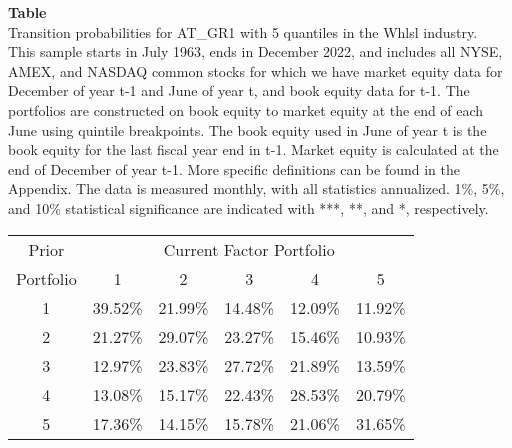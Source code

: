 \begin{table*}[ht!]
\raggedright
{}
\label{tab: transition_probs_AT_GR1_Whlsl_with_5_quantiles}
\textbf{Table \thetable} \\
Transition probabilities for AT_GR1 with 5 quantiles in the Whlsl industry. \\
\hspace*{1em}This sample starts in July 1963, ends in December 2022, and includes all NYSE, AMEX, and NASDAQ common stocks for which we have market equity data for December of year t-1 and June of year t, and book equity data for t-1. The portfolios are constructed on book equity to market equity at the end of each June using quintile breakpoints.  The book equity used in June of year t is the book equity for the last fiscal year end in t-1.  Market equity is calculated at the end of December of year t-1.  More specific definitions can be found in the Appendix.  The data is measured monthly, with all statistics annualized.  1\%, 5\%, and 10\% statistical significance are indicated with ***, **, and *, respectively. \\
\vspace{0.5em}
\centering
\begin{adjustbox}{max width=\textwidth}
\begin{tabular}{@{}cccccc@{}}
\toprule
Prior & \multicolumn{5}{c}{Current Factor Portfolio} \\
Portfolio & 1 & 2 & 3 & 4 & 5 \\
\midrule
1 & 39.52\% & 21.99\% & 14.48\% & 12.09\% & 11.92\% \\
2 & 21.27\% & 29.07\% & 23.27\% & 15.46\% & 10.93\% \\
3 & 12.97\% & 23.83\% & 27.72\% & 21.89\% & 13.59\% \\
4 & 13.08\% & 15.17\% & 22.43\% & 28.53\% & 20.79\% \\
5 & 17.36\% & 14.15\% & 15.78\% & 21.06\% & 31.65\% \\
\bottomrule
\end{tabular}
\end{adjustbox}
\end{table*}